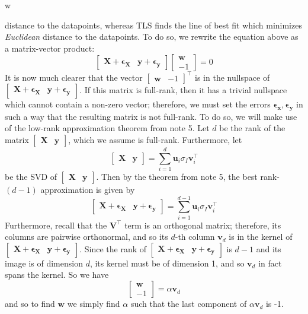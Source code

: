w\documentclass{article}
\begin{document}
distance to the datapoints, whereas TLS finds the line of best fit which minimizes \textit{Euclidean} distance to the datapoints. To do so, we rewrite the equation above as a matrix-vector product: $$\begin{bmatrix} \mathbf{X + \epsilon_X} & \mathbf{y + \epsilon_y}\end{bmatrix}\begin{bmatrix} \mathbf{w} \\ -1 \end{bmatrix} = 0$$ It is now much clearer that the vector $\begin{bmatrix} \mathbf{w} & -1 \end{bmatrix}^{\top}$ is in the nullspace of $\begin{bmatrix} \mathbf{X + \epsilon_X} & \mathbf{y + \epsilon_y}\end{bmatrix}$. If this matrix is full-rank, then it has a trivial nullspace which cannot contain a non-zero vector; therefore, we must set the errors $\mathbf{\epsilon_x, \epsilon_y}$ in such a way that the resulting matrix is not full-rank. To do so, we will make use of the low-rank approximation theorem from note 5. Let $d$ be the rank of the matrix $\begin{bmatrix} \mathbf{X} & \mathbf{y}\end{bmatrix}$, which we assume is full-rank. Furthermore, let $$\begin{bmatrix} \mathbf{X} & \mathbf{y}\end{bmatrix} = \sum\limits_{i=1}^d \mathbf{u}_i\sigma_I\mathbf{v}_i^{\top}$$ be the SVD of $\begin{bmatrix} \mathbf{X} & \mathbf{y}\end{bmatrix}$. Then by the theorem from note 5, the best rank-$(d-1)$ approximation is given by $$\begin{bmatrix} \mathbf{X + \epsilon_X} & \mathbf{y + \epsilon_y}\end{bmatrix} = \sum\limits_{i=1}^{d-1} \mathbf{u}_i\sigma_I\mathbf{v}_i^{\top}$$ Furthermore, recall that the $\mathbf{V}^{\top}$ term is an orthogonal matrix; therefore, its columns are pairwise orthonormal, and so its $d$-th column $\mathbf{v}_d$ is in the kernel of $\begin{bmatrix} \mathbf{X + \epsilon_X} & \mathbf{y + \epsilon_y}\end{bmatrix}$. Since the rank of $\begin{bmatrix} \mathbf{X + \epsilon_X} & \mathbf{y + \epsilon_y}\end{bmatrix}$ is $d - 1$ and its image is of dimension $d$, its kernel must be of dimension 1, and so $\mathbf{v}_d$ in fact spans the kernel. So we have $$\begin{bmatrix} \mathbf{w} \\ -1 \end{bmatrix} = \alpha \mathbf{v}_d$$ and so to find $\mathbf{w}$ we simply find $\alpha$ such that the last component of $\alpha\mathbf{v}_d$ is -1.
\end{document}
